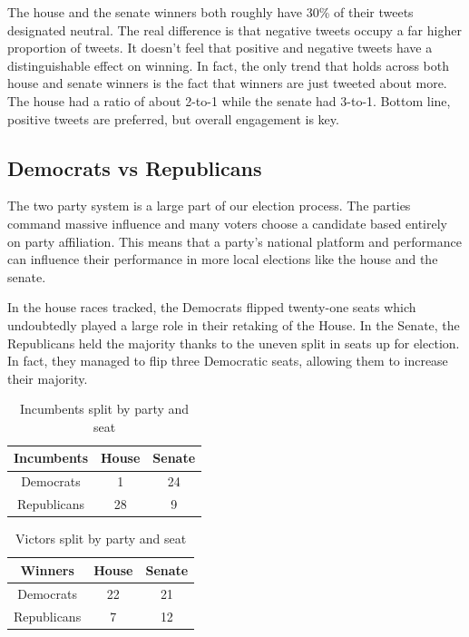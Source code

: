 \documentclass[11pt, twoside, reqno]{book}
\begin{document}
The house and the senate winners both roughly have 30\% of their tweets designated neutral. The real difference is that negative tweets occupy a far higher proportion of tweets. It doesn't feel that positive and negative tweets have a distinguishable effect on winning. In fact, the only trend that holds across both house and senate winners is the fact that winners are just tweeted about more. The house had a ratio of about 2-to-1 while the senate had 3-to-1. Bottom line, positive tweets are preferred, but overall engagement is key. 

\subsection{Democrats vs Republicans}
The two party system is a large part of our election process. The parties command massive influence and many voters choose a candidate based entirely on party affiliation. This means that a party's national platform and performance can influence their performance in more local elections like the house and the senate. 

In the house races tracked, the Democrats flipped twenty-one seats which undoubtedly played a large role in their retaking of the House. In the Senate, the Republicans held the majority thanks to the uneven split in seats up for election. In fact, they managed to flip three Democratic seats, allowing them to increase their majority. 

\begin{table}[H]
\centering
\begin{tabular}{|c|c|c|}
	\hline
	Incumbents & House & Senate \\
	\hline
	Democrats & 1 & 24\\
	\hline
	Republicans & 28 & 9\\
	\hline
\end{tabular}
\caption{Incumbents split by party and seat}\label{fig:incumbents_party_split}
\end{table}

\begin{table}[H]
\centering
\begin{tabular}{|c|c|c|}
	\hline
	Winners & House & Senate \\
	\hline
	Democrats & 22 & 21 \\
	\hline
	Republicans & 7 & 12 \\
	\hline
\end{tabular}
\caption{Victors split by party and seat}\label{fig:victors_party_split}
\end{table}
\end{document}
